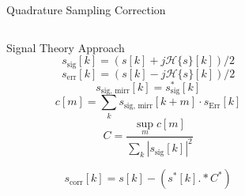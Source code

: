 \documentclass[10pt]{beamer}
\begin{document}
\begin{frame}{Quadrature Sampling Correction}
  \begin{columns}[T]
    \begin{column}{.5\textwidth}
      \begin{block}{Signal Theory Approach}
        \[s_{\text{sig}}[k] = (s[k] + j \mathcal{H}\{s\}[k])/2 \]
        \[s_{\text{err}}[k] = (s[k] - j \mathcal{H}\{s\}[k])/2 \]
        \[s_{\text{sig, mirr}}[k] = s_{\text{sig}}^*[k]\]
        \[c[m] = \sum_k s_{\text{sig, mirr}}[k+m] \cdot s_{\text{Err}}[k] \]
        \[C = \frac{\sup_m c[m]}{\sum_k |s_{\text{sig}}[k]|^2}\]

        \[s_{\text{corr}}[k] = s[k] - (s^*[k] .* C^*)\]
      \end{block}
    \end{column}
    \begin{column}{.5\textwidth}
\end{column}
\end{columns}
\end{frame}
\end{document}
